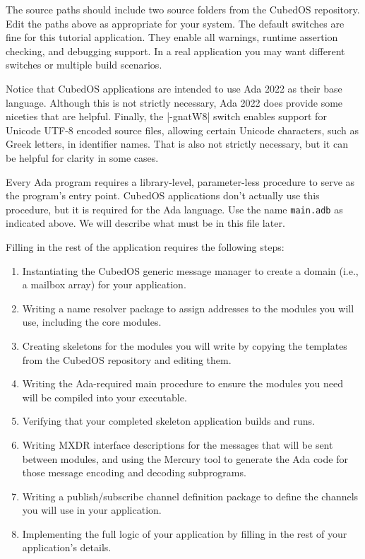 The source paths should include two source folders from the CubedOS repository. Edit the paths
above as appropriate for your system. The default switches are fine for this tutorial
application. They enable all warnings, runtime assertion checking, and debugging support. In a
real application you may want different switches or multiple build scenarios.

Notice that CubedOS applications are intended to use Ada 2022 as their base language. Although
this is not strictly necessary, Ada 2022 does provide some niceties that are helpful. Finally,
the |-gnatW8| switch enables support for Unicode UTF-8 encoded source files, allowing certain
Unicode characters, such as Greek letters, in identifier names. That is also not strictly
necessary, but it can be helpful for clarity in some cases.

Every Ada program requires a library-level, parameter-less procedure to serve as the program's
entry point. CubedOS applications don't actually use this procedure, but it is required for the
Ada language. Use the name \texttt{main.adb} as indicated above. We will describe what must be
in this file later.

Filling in the rest of the application requires the following steps:
\begin{enumerate}
\item Instantiating the CubedOS generic message manager to create a domain (i.e., a mailbox
  array) for your application.
\item Writing a name resolver package to assign addresses to the modules you will use, including
  the core modules.
\item Creating skeletons for the modules you will write by copying the templates from the
  CubedOS repository and editing them.
\item Writing the Ada-required main procedure to ensure the modules you need will be compiled
  into your executable.
\item Verifying that your completed skeleton application builds and runs.
\item Writing MXDR interface descriptions for the messages that will be sent between modules,
  and using the Mercury tool to generate the Ada code for those message encoding and decoding
  subprograms.
\item Writing a publish/subscribe channel definition package to define the channels you will use
  in your application.
\item Implementing the full logic of your application by filling in the rest of your
  application's details.
\end{enumerate}

